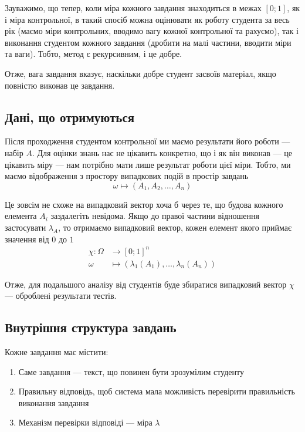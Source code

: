 Зауважимо, що тепер, коли міра кожного завдання знаходиться в межах
$\left[ 0; 1 \right]$, як і міра контрольної, в такий спосіб можна оцінювати
як роботу студента за весь рік (маємо міри контрольних, вводимо вагу кожної
контрольної та рахуємо), так і виконання студентом кожного завдання (дробити
на малі частини, вводити міри та ваги).
Тобто, метод є рекурсивним, і це добре.

Отже, вага завдання вказує, наскільки добре студент засвоїв матеріал, якщо
повністю виконав це завдання.

\subsection{Дані, що отримуються}

Після проходження студентом контрольної ми маємо результати його роботи ---
набір $A$.
Для оцінки знань нас не цікавить конкретно, що і як він виконав --- це цікавить
міру --- нам потрібно мати лише результат роботи цієї міри.
Тобто, ми маємо відображення з простору випадкових подій в простір завдань
\begin{equation*}
  \omega \mapsto \left( A_1, A_2, \dots, A_n \right)
\end{equation*}

Це зовсім не схоже на випадковий вектор хоча б через те, що будова кожного
елемента $A_i$ заздалегіть невідома.
Якщо до правої частини відношення застосувати $\lambda_A$, то отримаємо
випадковий вектор, кожен елемент якого приймає значення від $0$ до $1$
\begin{align*}
  \chi: \Omega &\rightarrow \left[ 0; 1 \right]^n \\
  \omega &\mapsto \left( \lambda_1\left( A_1 \right), \dots,
    \lambda_n\left( A_n \right) \right)
\end{align*}

Отже, для подальшого аналізу від студентів буде збиратися випадковий вектор
$\chi$ --- оброблені результати тестів.

\subsection{Внутрішня структура завдань}

Кожне завдання має містити:
\begin{enumerate}
  \item
    Саме завдання --- текст, що повинен бути зрозумілим студенту
  \item
    Правильну відповідь, щоб система мала можливість перевірити правильність
    виконання завдання
  \item
    Механізм перевірки відповіді --- міра $\lambda$
\end{enumerate}

